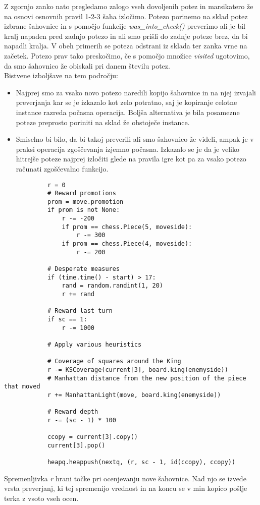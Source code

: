 \documentclass[runningheads]{llncs}
\begin{document}
Z zgornjo zanko nato pregledamo zalogo vseh dovoljenih potez in marsikatero že na osnovi osnovnih pravil 1-2-3 šaha izločimo. Potezo porinemo na sklad potez izbrane šahovnice in s pomočjo funkcije \textit{was\_into\_check()} preverimo ali je bil kralj napaden pred zadnjo potezo in ali smo prišli do zadnje poteze brez, da bi napadli kralja. V obeh primerih se poteza odstrani iz sklada ter zanka vrne na začetek. Potezo prav tako preskočimo, če s pomočjo množice \textit{visited} ugotovimo, da smo šahovnico že obiskali pri danem številu potez. \\
 Bistvene izboljšave na tem področju:
\begin{itemize}
  \item Najprej smo za vsako novo potezo naredili kopijo šahovnice in na njej izvajali preverjanja kar se je izkazalo kot zelo potratno, saj je kopiranje celotne instance razreda počasna operacija. Boljša alternativa je bila posamezne poteze preprosto poriniti na sklad že obstoječe instance.
  \item Smiselno bi bilo, da bi takoj preverili ali smo šahovnico že videli, ampak je v praksi operacija zgoščevanja izjemno počasna. Izkazalo se je da je veliko hitrejše poteze najprej izločiti glede na pravila igre kot pa za vsako potezo računati zgoščevalno funkcijo.
\end{itemize}
\begin{lstlisting}
            r = 0
            # Reward promotions
            prom = move.promotion
            if prom is not None:
                r -= -200
                if prom == chess.Piece(5, moveside):
                    r -= 300
                if prom == chess.Piece(4, moveside):
                    r -= 200

            # Desperate measures
            if (time.time() - start) > 17:
                rand = random.randint(1, 20)
                r += rand

            # Reward last turn
            if sc == 1:
                r -= 1000

            # Apply various heuristics

            # Coverage of squares around the King
            r -= KSCoverage(current[3], board.king(enemyside))
            # Manhattan distance from the new position of the piece that moved
            r += ManhattanLight(move, board.king(enemyside))

            # Reward depth
            r -= (sc - 1) * 100

            ccopy = current[3].copy()
            current[3].pop()

            heapq.heappush(nextq, (r, sc - 1, id(ccopy), ccopy))
\end{lstlisting}
Spremenljivka \textit{r} hrani točke pri ocenjevanju nove šahovnice. Nad njo se izvede vrsta preverjanj, ki tej spremenijo vrednost in na koncu se v min kopico pošlje terka z vsoto vseh ocen.
\end{document}
